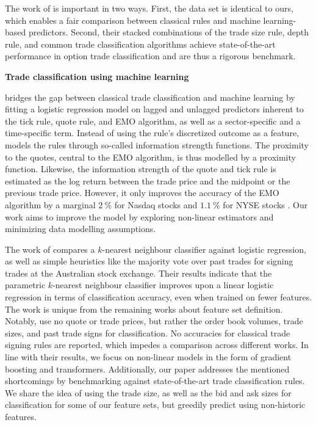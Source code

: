 The work of \textcite{grauerOptionTradeClassification2022} is important in two ways. First, the data set is identical to ours, which enables a fair comparison between classical rules and machine learning-based predictors. Second, their stacked combinations of the trade size rule, depth rule, and common trade classification algorithms achieve state-of-the-art performance in option trade classification and are thus a rigorous benchmark.

\textbf{Trade classification using machine learning}

\textcite[5]{rosenthalModelingTradeDirection2012} bridges the gap between classical trade classification and machine learning by fitting a logistic regression model on lagged and unlagged predictors inherent to the tick rule, quote rule, and EMO algorithm, as well as a sector-specific and a time-specific term. Instead of using the rule's discretized outcome as a feature, \textcite[481-482]{rosenthalModelingTradeDirection2012} models the rules through so-called information strength functions. The proximity to the quotes, central to the EMO algorithm, is thus modelled by a proximity function. Likewise, the information strength of the quote and tick rule is estimated as the log return between the trade price and the midpoint or the previous trade price. However, it only improves the accuracy of the EMO algorithm by a marginal $2~\%$ for Nasdaq stocks and $1.1~\%$ for NYSE stocks \textcite[15]{rosenthalModelingTradeDirection2012}. Our work aims to improve the model by exploring non-linear estimators and minimizing data modelling assumptions.

The work of \textcite[483]{blazejewskiLocalNonParametricModel2005} compares a $k$-nearest neighbour classifier against logistic regression, as well as simple heuristics like the majority vote over past trades for signing trades at the Australian stock exchange. Their results indicate that the parametric $k$-nearest neighbour classifier improves upon a linear logistic regression in terms of classification accuracy, even when trained on fewer features. The work is unique from the remaining works about feature set definition. Notably, \textcite[3]{blazejewskiLocalNonParametricModel2005} use no quote or trade prices, but rather the order book volumes, trade sizes, and past trade signs for classification. No accuracies for classical trade signing rules are reported, which impedes a comparison across different works. In line with their results, we focus on non-linear models in the form of gradient boosting and transformers. Additionally, our paper addresses the mentioned shortcomings by benchmarking against state-of-the-art trade classification rules. We share the idea of using the trade size, as well as the bid and ask sizes for classification for some of our feature sets, but greedily predict using non-historic features.

